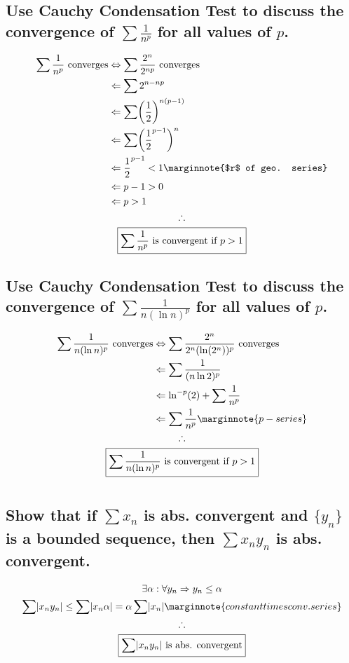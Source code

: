 \documentclass[letterpaper]{article}
\DeclarePairedDelimiter{\abs}{\lvert}{\rvert}
\DeclarePairedDelimiter{\paren}{(}{)}
\begin{document}
\subsection{Use Cauchy Condensation Test to discuss the convergence of $\sum\frac{1}{n^p}$ for all values of $p$.}
\begin{gather*}
\begin{aligned}	
\sum\frac{1}{n^p}\text{ converges}&\Leftrightarrow\sum\frac{2^n}{2^{np}}\text{ converges} \\
&\Leftarrow\sum2^{n-np} \\
&\Leftarrow\sum\paren[\bigg]{\frac{1}{2}}^{n(p-1)} \\
&\Leftarrow\sum\paren[\bigg]{\frac{1}{2}^{p-1}}^n \\
&\Leftarrow \frac{1}{2}^{p-1}<1 \marginnote{$r$ of geo. series} \\
&\Leftarrow p-1>0 \\
&\Leftarrow p>1 \\
\end{aligned} \\
\therefore \\
\boxed{\sum\frac{1}{n^p} \text{ is convergent if }p>1}
\end{gather*}
\subsection{Use Cauchy Condensation Test to discuss the convergence of $\sum\frac{1}{n(\ln n)^p}$ for all values of $p$.}
\begin{gather*}
\begin{aligned}
\sum\frac{1}{n(\ln n)^p}\text{ converges}&\Leftrightarrow\sum\frac{2^n}{2^n(\ln(2^n))^p}\text{ converges} \\
&\Leftarrow\sum\frac{1}{(n\ln2)^p} \\
&\Leftarrow\ln^{-p}(2)+\sum\frac{1}{n^p} \\
&\Leftarrow\sum\frac{1}{n^p} \marginnote{p-series}
\end{aligned} \\
\therefore \\
\boxed{\sum\frac{1}{n(\ln n)^p}\text{ is convergent if }p>1}
\end{gather*}

\section{}
\subsection{Show that if $\sum x_n$ is abs. convergent and $\{y_n\}$ is a bounded sequence, then $\sum x_ny_n$ is abs. convergent.}
\begin{gather*}
\exists\alpha:\forall y_n\Rightarrow y_n\leq\alpha \\
\sum\abs{x_ny_n}\leq\sum\abs{x_n\alpha}=\alpha\sum\abs{x_n} \marginnote{constant times conv. series} \\
\therefore \\
\boxed{\sum\abs{x_ny_n}\text{ is abs. convergent}}
\end{gather*}
\end{document}

